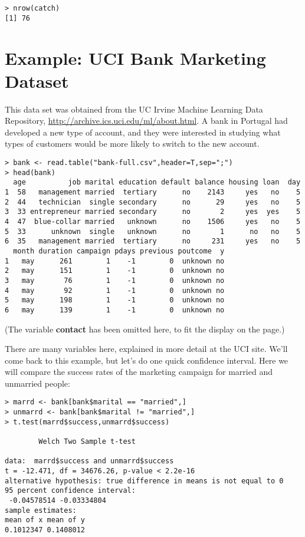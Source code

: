 \begin{lstlisting}
> nrow(catch)
[1] 76
\end{lstlisting}

\section{Example:  UCI Bank Marketing Dataset}
\label{ucibank}

This data set was obtained from the UC Irvine Machine Learning Data
Repository, \url{http://archive.ics.uci.edu/ml/about.html}.  A bank in
Portugal had developed a new type of account, and they were interested
in studying what types of customers would be more likely to switch to
the new account.

\begin{lstlisting}
> bank <- read.table("bank-full.csv",header=T,sep=";")
> head(bank)
  age          job marital education default balance housing loan  day
1  58   management married  tertiary      no    2143     yes   no    5
2  44   technician  single secondary      no      29     yes   no    5
3  33 entrepreneur married secondary      no       2     yes  yes    5
4  47  blue-collar married   unknown      no    1506     yes   no    5
5  33      unknown  single   unknown      no       1      no   no    5
6  35   management married  tertiary      no     231     yes   no    5
  month duration campaign pdays previous poutcome  y
1   may      261        1    -1        0  unknown no
2   may      151        1    -1        0  unknown no
3   may       76        1    -1        0  unknown no
4   may       92        1    -1        0  unknown no
5   may      198        1    -1        0  unknown no
6   may      139        1    -1        0  unknown no
\end{lstlisting} 

(The variable {\bf contact} has been omitted here, to fit the display on
the page.)

There are many variables here, explained in more detail at the UCI site.
We'll come back to this example, but let's do one quick confidence
interval.  Here we will compare the success rates of the marketing
campaign for married and unmarried people:

\begin{lstlisting}
> marrd <- bank[bank$marital == "married",]
> unmarrd <- bank[bank$marital != "married",]
> t.test(marrd$success,unmarrd$success)

        Welch Two Sample t-test

data:  marrd$success and unmarrd$success
t = -12.471, df = 34676.26, p-value < 2.2e-16
alternative hypothesis: true difference in means is not equal to 0
95 percent confidence interval:
 -0.04578514 -0.03334804
sample estimates:
mean of x mean of y 
0.1012347 0.1408012 
\end{lstlisting}

